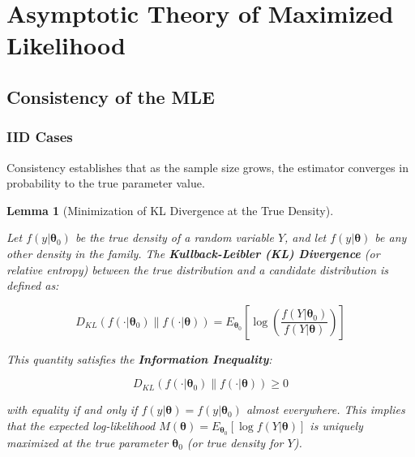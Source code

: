 \documentclass[
  letterpaper,
  DIV=11,
  numbers=noendperiod]{scrreprt}
\renewcommand{\[}{\begin{equation}}
\renewcommand{\]}{\end{equation}}
\theoremstyle{definition}
\theoremstyle{plain}
\theoremstyle{plain}
\theoremstyle{plain}
\theoremstyle{definition}
\theoremstyle{plain}
\newtheorem{lemma}{Lemma}[chapter]
\theoremstyle{remark}
\begin{document}
\section{Asymptotic Theory of Maximized
Likelihood}\label{asymptotic-theory-of-maximized-likelihood}

\subsection{Consistency of the MLE}\label{consistency-of-the-mle}

\subsubsection{IID Cases}\label{iid-cases}

Consistency establishes that as the sample size grows, the estimator
converges in probability to the true parameter value.

\begin{lemma}[Minimization of KL Divergence at the True
Density]\protect\hypertarget{lem-kl-divergence-mle}{}\label{lem-kl-divergence-mle}

Let \(f(y|\boldsymbol{\theta}_0)\) be the true density of a random
variable \(Y\), and let \(f(y|\boldsymbol{\theta})\) be any other
density in the family. The \textbf{Kullback-Leibler (KL) Divergence} (or
relative entropy) between the true distribution and a candidate
distribution is defined as:

\[
D_{KL}(f(\cdot|\boldsymbol{\theta}_0) \| f(\cdot|\boldsymbol{\theta})) = E_{\boldsymbol{\theta}_0} \left[ \log \left( \frac{f(Y|\boldsymbol{\theta}_0)}{f(Y|\boldsymbol{\theta})} \right) \right]
\]

This quantity satisfies the \textbf{Information Inequality}:

\[
D_{KL}(f(\cdot|\boldsymbol{\theta}_0) \| f(\cdot|\boldsymbol{\theta})) \ge 0
\]

with equality if and only if
\(f(y|\boldsymbol{\theta}) = f(y|\boldsymbol{\theta}_0)\) almost
everywhere. This implies that the expected log-likelihood
\(M(\boldsymbol{\theta}) = E_{\boldsymbol{\theta}_0}[\log f(Y|\boldsymbol{\theta})]\)
is uniquely maximized at the true parameter \(\boldsymbol{\theta}_0\)
(or true density for \(Y\)).

\end{lemma}
\end{document}
